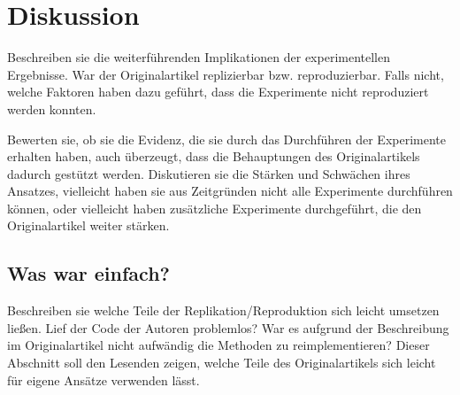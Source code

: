 \documentclass[DIV=13,fontsize=11pt]{scrartcl}
\begin{document}

\section{Diskussion}
Beschreiben sie die weiterführenden Implikationen der experimentellen Ergebnisse.
War der Originalartikel replizierbar bzw. reproduzierbar.
Falls nicht, welche Faktoren haben dazu geführt, dass die Experimente nicht reproduziert werden konnten. 


Bewerten sie, ob sie die Evidenz, die sie durch das Durchführen der Experimente erhalten haben, auch überzeugt, dass die Behauptungen des Originalartikels dadurch gestützt werden.
Diskutieren sie die Stärken und Schwächen ihres Ansatzes, vielleicht haben sie aus Zeitgründen nicht alle Experimente durchführen können, oder vielleicht haben zusätzliche Experimente durchgeführt, die den Originalartikel weiter stärken. 



\subsection{Was war einfach?}
Beschreiben sie welche Teile der Replikation/Reproduktion sich leicht umsetzen ließen.
Lief der Code der Autoren problemlos? War es aufgrund der Beschreibung im Originalartikel nicht aufwändig die Methoden zu reimplementieren? 
Dieser Abschnitt soll den Lesenden zeigen, welche Teile des Originalartikels sich leicht für eigene Ansätze verwenden lässt. 

\end{document}
